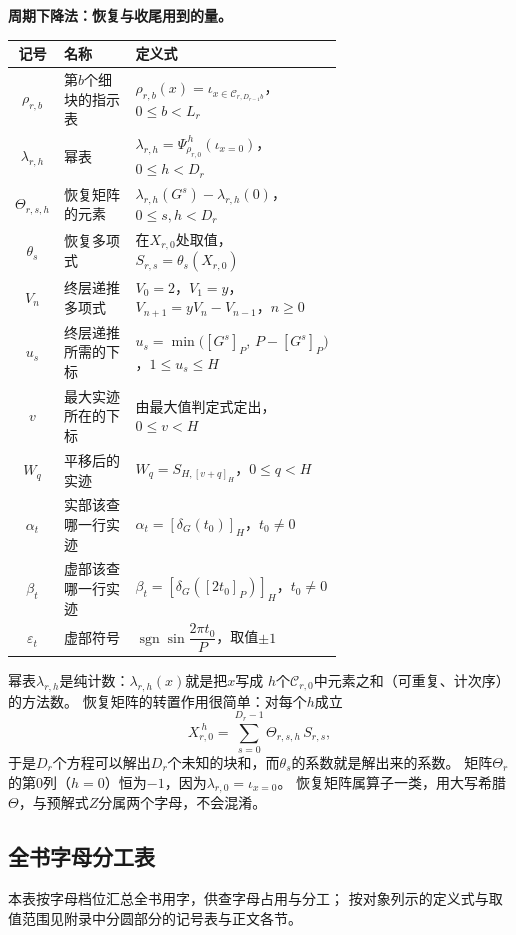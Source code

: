 \documentclass[UTF8,a4paper,11pt]{ctexart}
\begin{document}
\textbf{周期下降法：恢复与收尾用到的量。}
\begin{center}
\begin{tabular}{c|>{\raggedright\arraybackslash}p{0.27\linewidth}|>{\raggedright\arraybackslash}p{0.38\linewidth}}
\toprule
记号 & 名称 & 定义式 \\
\midrule
$\rho_{r,b}$ & 第$b$个细块的指示表 & $\rho_{r,b}(x)=\iota_{x\in\mathscr{C}_{r,D_{r-1}b}}$，$0\le b<L_r$ \\
$\lambda_{r,h}$ & 幂表 & $\lambda_{r,h}=\Psi_{\rho_{r,0}}^{\,h}(\iota_{x=0})$，$0\le h<D_r$ \\
$\Theta_{r,s,h}$ & 恢复矩阵的元素 & $\lambda_{r,h}(G^s)-\lambda_{r,h}(0)$，$0\le s,h<D_r$ \\
$\theta_s$ & 恢复多项式 & 在$X_{r,0}$处取值，$S_{r,s}=\theta_s(X_{r,0})$ \\
$V_n$ & 终层递推多项式 & $V_0=2$，$V_1=y$，$V_{n+1}=yV_n-V_{n-1}$，$n\ge0$ \\
$u_s$ & 终层递推所需的下标 & $u_s=\min\bigl([G^s]_P,\,P-[G^s]_P\bigr)$，$1\le u_s\le H$ \\
$v$ & 最大实迹所在的下标 & 由最大值判定式定出，$0\le v<H$ \\
$W_q$ & 平移后的实迹 & $W_q=S_{H,[v+q]_H}$，$0\le q<H$ \\
$\alpha_t$ & 实部该查哪一行实迹 & $\alpha_t=[\delta_G(t_0)]_H$，$t_0\ne0$ \\
$\beta_t$ & 虚部该查哪一行实迹 & $\beta_t=[\delta_G([2t_0]_P)]_H$，$t_0\ne0$ \\
$\varepsilon_t$ & 虚部符号 & $\operatorname{sgn}\sin\dfrac{2\pi t_0}{P}$，取值$\pm1$ \\
\bottomrule
\end{tabular}
\end{center}
幂表$\lambda_{r,h}$是纯计数：$\lambda_{r,h}(x)$就是把$x$写成
$h$个$\mathscr{C}_{r,0}$中元素之和（可重复、计次序）的方法数。
恢复矩阵的转置作用很简单：对每个$h$成立
\[
 X_{r,0}^{\ h}=\sum_{s=0}^{D_r-1}\Theta_{r,s,h}\,S_{r,s},
\]
于是$D_r$个方程可以解出$D_r$个未知的块和，而$\theta_s$的系数就是解出来的系数。
矩阵$\Theta_r$的第$0$列（$h=0$）恒为$-1$，因为$\lambda_{r,0}=\iota_{x=0}$。
恢复矩阵属算子一类，用大写希腊$\Theta$，与预解式$Z$分属两个字母，不会混淆。
\subsection{全书字母分工表}
本表按字母档位汇总全书用字，供查字母占用与分工；
按对象列示的定义式与取值范围见附录中分圆部分的记号表与正文各节。\par
\end{document}
